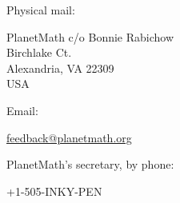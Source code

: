 Physical mail: 

\indent PlanetMath c/o Bonnie Rabichow \\
 Birchlake Ct. \\
\indent Alexandria, VA 22309 \\
\indent USA

\noindent Email:

\indent \url{feedback@planetmath.org}

\noindent PlanetMath's secretary, by phone:

\indent +1-505-INKY-PEN
